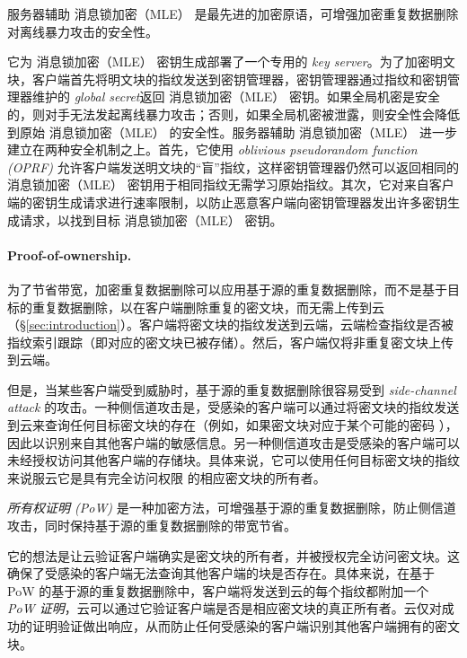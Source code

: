 服务器辅助 消息锁加密（MLE） \cite{bellare13b} 是最先进的加密原语，可增强加密重复数据删除对离线暴力攻击的安全性。

它为 消息锁加密（MLE） 密钥生成部署了一个专用的 \textit{ key server}。为了加密明文块，客户端首先将明文块的指纹发送到密钥管理器，密钥管理器通过指纹和密钥管理器维护的\textit{ global secret}返回 消息锁加密（MLE） 密钥。如果全局机密是安全的，则对手无法发起离线暴力攻击；否则，如果全局机密被泄露，则安全性会降低到原始 消息锁加密（MLE） 的安全性。服务器辅助 消息锁加密（MLE） 进一步建立在两种安全机制之上。首先，它使用 \textit{ oblivious pseudorandom function (OPRF)} \cite{naor04} 允许客户端发送明文块的“盲”指纹，这样密钥管理器仍然可以返回相同的 消息锁加密（MLE） 密钥用于相同指纹无需学习原始指纹。其次，它对来自客户端的密钥生成请求进行速率限制，以防止恶意客户端向密钥管理器发出许多密钥生成请求，以找到目标 消息锁加密（MLE） 密钥。

\paragraph{Proof-of-ownership.} 为了节省带宽，加密重复数据删除可以应用基于源的重复数据删除，而不是基于目标的重复数据删除，以在客户端删除重复的密文块，而无需上传到云（\S\ref{sec:introduction}）。客户端将密文块的指纹发送到云端，云端检查指纹是否被指纹索引跟踪（即对应的密文块已被存储）。然后，客户端仅将非重复密文块上传到云端。


但是，当某些客户端受到威胁时，基于源的重复数据删除很容易受到 \textit{ side-channel attack} \cite{harnik10,halevi11} 的攻击。一种侧信道攻击是，受感染的客户端可以通过将密文块的指纹发送到云来查询任何目标密文块的存在（例如，如果密文块对应于某个可能的密码 \cite{harnik10}），因此以识别来自其​​他客户端的敏感信息。另一种侧信道攻击是受感染的客户端可以未经授权访问其他客户端的存储块。具体来说，它可以使用任何目标密文块的指纹来说服云它是具有完全访问权限 \cite{halevi11} 的相应密文块的所有者。


\textit{ 所有权证明 (PoW)} \cite{halevi11} 是一种加密方法，可增强基于源的重复数据删除，防止侧信道攻击，同时保持基于源的重复数据删除的带宽节省。

它的想法是让云验证客户端确实是密文块的所有者，并被授权完全访问密文块。这确保了受感染的客户端无法查询其他客户端的块是否存在。具体来说，在基于 PoW 的基于源的重复数据删除中，客户端将发送到云的每个指纹都附加一个 \textit{ PoW 证明}，云可以通过它验证客户端是否是相应密文块的真正所有者。云仅对成功的证明验证做出响应，从而防止任何受感染的客户端识别其他客户端拥有的密文块。 

